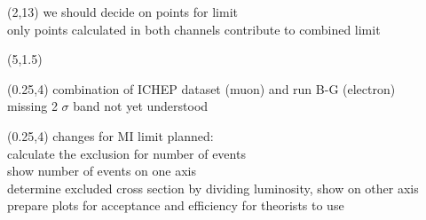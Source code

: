 \begin{frame}
        \begin{textblock}{14}(2,13) %
            we should decide on points for limit\\
            only points calculated in both channels contribute to combined limit
        \end{textblock}
        \begin{textblock}{11}(5,1.5) %
        \end{textblock}
        \begin{textblock}{4}(0.25,4) %
            combination of ICHEP dataset (muon) and run B-G (electron)\\[1cm]
            missing 2 $\sigma$ band not yet understood
        \end{textblock}
\end{frame}
\begin{frame}
        \begin{textblock}{15}(0.25,4) %
            changes for MI limit planned:\\[1cm]
            calculate the exclusion for number of events\\
            show number of events on one axis\\
            determine excluded cross section by dividing luminosity, show on other axis\\
            prepare plots for acceptance and efficiency for theorists to use\\
        \end{textblock}
\end{frame}